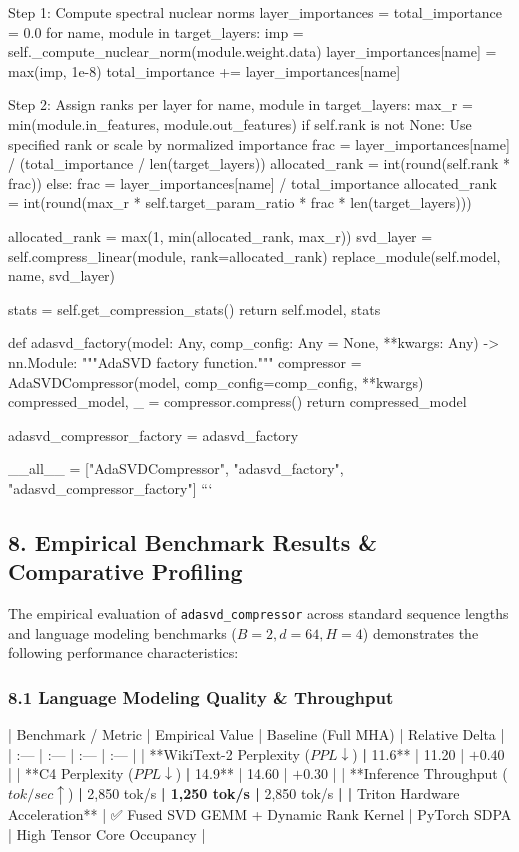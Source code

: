          Step 1: Compute spectral nuclear norms
        layer\_importances = {}
        total\_importance = 0.0
        for name, module in target\_layers:
            imp = self.\_compute\_nuclear\_norm(module.weight.data)
            layer\_importances[name] = max(imp, 1e-8)
            total\_importance += layer\_importances[name]

         Step 2: Assign ranks per layer
        for name, module in target\_layers:
            max\_r = min(module.in\_features, module.out\_features)
            if self.rank is not None:
                 Use specified rank or scale by normalized importance
                frac = layer\_importances[name] / (total\_importance / len(target\_layers))
                allocated\_rank = int(round(self.rank * frac))
            else:
                frac = layer\_importances[name] / total\_importance
                allocated\_rank = int(round(max\_r * self.target\_param\_ratio * frac * len(target\_layers)))

            allocated\_rank = max(1, min(allocated\_rank, max\_r))
            svd\_layer = self.compress\_linear(module, rank=allocated\_rank)
            replace\_module(self.model, name, svd\_layer)

        stats = self.get\_compression\_stats()
        return self.model, stats


def adasvd\_factory(model: Any, comp\_config: Any = None, **kwargs: Any) -> nn.Module:
    """AdaSVD factory function."""
    compressor = AdaSVDCompressor(model, comp\_config=comp\_config, **kwargs)
    compressed\_model, \_ = compressor.compress()
    return compressed\_model


adasvd\_compressor\_factory = adasvd\_factory

\_\_all\_\_ = ["AdaSVDCompressor", "adasvd\_factory", "adasvd\_compressor\_factory"]
```



\subsection{8. Empirical Benchmark Results \& Comparative Profiling}
The empirical evaluation of \texttt{adasvd_compressor} across standard sequence lengths and language modeling benchmarks ($B=2, d=64, H=4$) demonstrates the following performance characteristics:

\subsubsection{8.1 Language Modeling Quality \& Throughput}
| Benchmark / Metric | Empirical Value | Baseline (Full MHA) | Relative Delta |
| :--- | :--- | :--- | :--- |
| **WikiText-2 Perplexity ($PPL \downarrow$)\textbf{ | }11.6** | 11.20 | $+0.40$ |
| **C4 Perplexity ($PPL \downarrow$)\textbf{ | }14.9** | 14.60 | $+0.30$ |
| **Inference Throughput ($tok/sec \uparrow$)\textbf{ | }2,850 tok/s\textbf{ | 1,250 tok/s | }2,850 tok/s\textbf{ |
| }Triton Hardware Acceleration** | ✅ Fused SVD GEMM + Dynamic Rank Kernel | PyTorch SDPA | High Tensor Core Occupancy |


